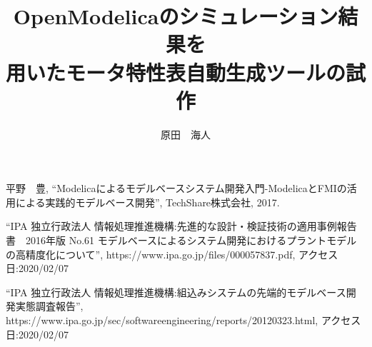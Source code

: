 \documentclass[uplatex, report, a4j, 10pt]{jsbook}
\title{OpenModelicaのシミュレーション結果を\\用いたモータ特性表自動生成ツールの試作}
\author{原田　海人}
\begin{document}
\maketitle


%
%


%
% 
% 
%



%
\acknowledgment


%

\begin{thebibliography}{0}
  平野　豊, ``Modelicaによるモデルベースシステム開発入門-ModelicaとFMIの活用による実践的モデルベース開発'',  TechShare株式会社, 2017.

  ``IPA 独立行政法人 情報処理推進機構:先進的な設計・検証技術の適用事例報告書　2016年版 No.61 モデルベースによるシステム開発におけるプラントモデルの高精度化について'', https://www.ipa.go.jp/files/000057837.pdf, アクセス日:2020/02/07

  ``IPA 独立行政法人 情報処理推進機構:組込みシステムの先端的モデルベース開発実態調査報告'', https://www.ipa.go.jp/sec/softwareengineering/reports/20120323.html, アクセス日:2020/02/07
  \end{thebibliography}
\end{document}
